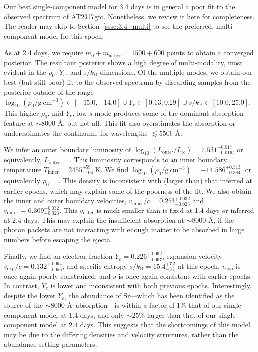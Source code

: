 \documentclass[twocolumn, twocolappendix]{aastex63}
\begin{document}
Our best single-component model for 3.4 days is in general a poor fit to the observed spectrum of AT2017gfo. Nonetheless, we review it here for completeness. The reader may skip to Section~\ref{sssc:3.4_multi} to see the preferred, multi-component model for this epoch. 

As at 2.4 days, we require $m_0 + m_{\mathrm{active}} = 1500 + 600$ points to obtain a converged posterior. The resultant posterior shows a high degree of multi-modality, most evident in the $\rho_0$, $Y_e$, and $s / k_{\mathrm{B}}$ dimensions. Of the multiple modes, we obtain our best (but still poor) fit to the observed spectrum by discarding samples from the posterior outside of the range $\log_{10}(\rho_0 / \mathrm{g~cm^{-3}}) \in [-15.0, -14.0] \cup Y_{\mathrm{e}} \in [0.13, 0.29] \cup s/k_{\mathrm{B}} \in [10.0, 25.0]$. This higher-$\rho_0$, mid-$Y_e$, low-$s$ mode produces some of the dominant absorption feature at $\sim8000$ \AA, but not all. This fit also overstimates the absorption or underestimates the continuum, for wavelengths $\lesssim 5500$ \AA. 

We infer an outer boundary luminosity of $\log_{10} (L_{\mathrm{outer}}/L_{\odot}) = 7.531^{+0.017}_{-0.016}$, or equivalently, $L_{\mathrm{outer}} = $. This luminosity corresponds to an inner boundary temperature $T_{\mathrm{inner}} = 2455^{+59}_{-104}~\mathrm{K}$. We find $\log_{10} (\rho_0 / \mathrm{g~cm^{-3}}) = -14.586^{+0.313}_{-0.384}$, or equivalently $\rho_0 = $. This density is inconsistent with (larger than) that inferred at earlier epochs, which may explain some of the poorness of the fit. We also obtain the inner and outer boundary velocities, $v_{\mathrm{inner}}/c = 0.253^{+0.032}_{-0.023}$ and $v_{\mathrm{outer}} = 0.309^{+0.032}_{-0.023}$. This $v_{\mathrm{outer}}$ is much smaller than is fixed at 1.4 days or inferred at 2.4 days. This may explain the insufficient absorption at $\sim8000$ \AA, if the photon packets are not interacting with enough matter to be absorbed in large numbers before escaping the ejecta.

Finally, we find an electron fraction $Y_e = 0.226^{+0.062}_{-0.067}$, expansion velocity $v_{\mathrm{exp}}/c = 0.132^{+0.094}_{-0.056}$, and specific entropy $s/k_{\mathrm{B}} = 15.4^{+7.2}_{-3.1}$ at this epoch. $v_{\mathrm{exp}}$ is once again poorly constrained, and $s$ is once again consistent with earlier epochs. In contrast, $Y_e$ is lower and inconsistent with both previous epochs. Interestingly, despite the lower $Y_e$, the abundance of Sr---which has been identified as the source of the $\sim 8000$ \AA~absorption---is within a factor of $1$\% that of our single-component model at 1.4 days, and only $\sim 25$\% larger than that of our single-component model at 2.4 days. This suggests that the shortcomings of this model may be due to the differing densities and velocity structures, rather than the abundance-setting parameters.
\end{document}

